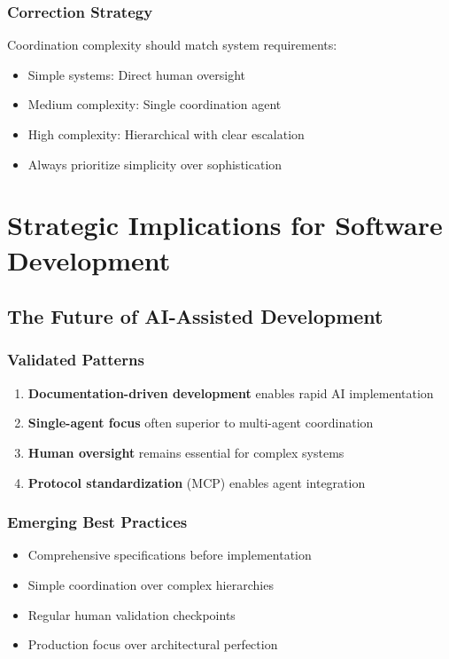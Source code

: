 \documentclass[11pt]{article}
\begin{document}
\subsubsection{Correction Strategy}
\label{sec:orgfcba228}
Coordination complexity should match system requirements:
\begin{itemize}
\item Simple systems: Direct human oversight
\item Medium complexity: Single coordination agent
\item High complexity: Hierarchical with clear escalation
\item Always prioritize simplicity over sophistication
\end{itemize}
\section{Strategic Implications for Software Development}
\label{sec:orgaa08747}

\subsection{The Future of AI-Assisted Development}
\label{sec:org702ab02}
\subsubsection{Validated Patterns}
\label{sec:org3cb6098}
\begin{enumerate}
\item \textbf{\textbf{Documentation-driven development}} enables rapid AI implementation
\item \textbf{\textbf{Single-agent focus}} often superior to multi-agent coordination
\item \textbf{\textbf{Human oversight}} remains essential for complex systems
\item \textbf{\textbf{Protocol standardization}} (MCP) enables agent integration
\end{enumerate}
\subsubsection{Emerging Best Practices}
\label{sec:org5cbcefd}
\begin{itemize}
\item Comprehensive specifications before implementation
\item Simple coordination over complex hierarchies
\item Regular human validation checkpoints
\item Production focus over architectural perfection
\end{itemize}
\end{document}
